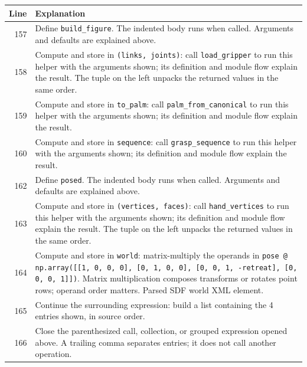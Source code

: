 \documentclass[11pt,a4paper]{book}
\begin{document}
\begin{longtable}{r p{}}

\textbf{Line} & \textbf{Explanation} \\ \hline \endhead

157 & Define \texttt{build\_figure}. The indented body runs when called. Arguments and defaults are explained above. \\

158 & Compute and store in \texttt{(links, joints)}: call \texttt{load\_gripper} to run this helper with the arguments shown; its definition and module flow explain the result. The tuple on the left unpacks the returned values in the same order. \\

159 & Compute and store in \texttt{to\_palm}: call \texttt{palm\_from\_canonical} to run this helper with the arguments shown; its definition and module flow explain the result.  \\

160 & Compute and store in \texttt{sequence}: call \texttt{grasp\_sequence} to run this helper with the arguments shown; its definition and module flow explain the result.  \\

162 & Define \texttt{posed}. The indented body runs when called. Arguments and defaults are explained above. \\

163 & Compute and store in \texttt{(vertices, faces)}: call \texttt{hand\_vertices} to run this helper with the arguments shown; its definition and module flow explain the result. The tuple on the left unpacks the returned values in the same order. \\

164 & Compute and store in \texttt{world}: matrix-multiply the operands in \texttt{pose @ np.array([[1, 0, 0, 0], [0, 1, 0, 0], [0, 0, 1, -retreat], [0, 0, 0, 1]])}. Matrix multiplication composes transforms or rotates point rows; operand order matters. Parsed SDF world XML element. \\

165 & Continue the surrounding expression: build a list containing the 4 entries shown, in source order. \\

166 & Close the parenthesized call, collection, or grouped expression opened above. A trailing comma separates entries; it does not call another operation. \\


\end{longtable}
\end{document}

